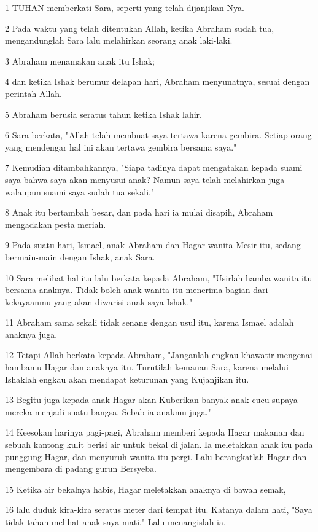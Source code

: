 \par 1 TUHAN memberkati Sara, seperti yang telah dijanjikan-Nya.
\par 2 Pada waktu yang telah ditentukan Allah, ketika Abraham sudah tua, mengandunglah Sara lalu melahirkan seorang anak laki-laki.
\par 3 Abraham menamakan anak itu Ishak;
\par 4 dan ketika Ishak berumur delapan hari, Abraham menyunatnya, sesuai dengan perintah Allah.
\par 5 Abraham berusia seratus tahun ketika Ishak lahir.
\par 6 Sara berkata, "Allah telah membuat saya tertawa karena gembira. Setiap orang yang mendengar hal ini akan tertawa gembira bersama saya."
\par 7 Kemudian ditambahkannya, "Siapa tadinya dapat mengatakan kepada suami saya bahwa saya akan menyusui anak? Namun saya telah melahirkan juga walaupun suami saya sudah tua sekali."
\par 8 Anak itu bertambah besar, dan pada hari ia mulai disapih, Abraham mengadakan pesta meriah.
\par 9 Pada suatu hari, Ismael, anak Abraham dan Hagar wanita Mesir itu, sedang bermain-main dengan Ishak, anak Sara.
\par 10 Sara melihat hal itu lalu berkata kepada Abraham, "Usirlah hamba wanita itu bersama anaknya. Tidak boleh anak wanita itu menerima bagian dari kekayaanmu yang akan diwarisi anak saya Ishak."
\par 11 Abraham sama sekali tidak senang dengan usul itu, karena Ismael adalah anaknya juga.
\par 12 Tetapi Allah berkata kepada Abraham, "Janganlah engkau khawatir mengenai hambamu Hagar dan anaknya itu. Turutilah kemauan Sara, karena melalui Ishaklah engkau akan mendapat keturunan yang Kujanjikan itu.
\par 13 Begitu juga kepada anak Hagar akan Kuberikan banyak anak cucu supaya mereka menjadi suatu bangsa. Sebab ia anakmu juga."
\par 14 Keesokan harinya pagi-pagi, Abraham memberi kepada Hagar makanan dan sebuah kantong kulit berisi air untuk bekal di jalan. Ia meletakkan anak itu pada punggung Hagar, dan menyuruh wanita itu pergi. Lalu berangkatlah Hagar dan mengembara di padang gurun Bersyeba.
\par 15 Ketika air bekalnya habis, Hagar meletakkan anaknya di bawah semak,
\par 16 lalu duduk kira-kira seratus meter dari tempat itu. Katanya dalam hati, "Saya tidak tahan melihat anak saya mati." Lalu menangislah ia.
